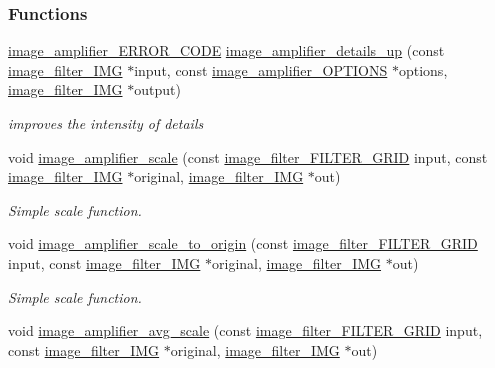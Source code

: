 \subsubsection*{Functions}
\begin{DoxyCompactItemize}
\item 
\hyperlink{a00011_a0d1363de9476dc6ae5b800ea4fade103}{image\-\_\-amplifier\-\_\-\-E\-R\-R\-O\-R\-\_\-\-C\-O\-D\-E} \hyperlink{a00011_ae99654f2d59a77ebcc06fbc4fcb46bf7}{image\-\_\-amplifier\-\_\-details\-\_\-up} (const \hyperlink{a00004}{image\-\_\-filter\-\_\-\-I\-M\-G} $\ast$input, const \hyperlink{a00002}{image\-\_\-amplifier\-\_\-\-O\-P\-T\-I\-O\-N\-S} $\ast$options, \hyperlink{a00004}{image\-\_\-filter\-\_\-\-I\-M\-G} $\ast$output)
\begin{DoxyCompactList}\small\item\em improves the intensity of details \end{DoxyCompactList}\item 
void \hyperlink{a00011_a8cf8d5fc4dc72339a2ca0b21d8b6c69e}{image\-\_\-amplifier\-\_\-scale} (const \hyperlink{a00012_a3d41ec3c203c47ad7dec21ff55acc883}{image\-\_\-filter\-\_\-\-F\-I\-L\-T\-E\-R\-\_\-\-G\-R\-I\-D} input, const \hyperlink{a00004}{image\-\_\-filter\-\_\-\-I\-M\-G} $\ast$original, \hyperlink{a00004}{image\-\_\-filter\-\_\-\-I\-M\-G} $\ast$out)
\begin{DoxyCompactList}\small\item\em Simple scale function. \end{DoxyCompactList}\item 
void \hyperlink{a00011_a7ef6a75724d9ffa2c5aec848895a0be7}{image\-\_\-amplifier\-\_\-scale\-\_\-to\-\_\-origin} (const \hyperlink{a00012_a3d41ec3c203c47ad7dec21ff55acc883}{image\-\_\-filter\-\_\-\-F\-I\-L\-T\-E\-R\-\_\-\-G\-R\-I\-D} input, const \hyperlink{a00004}{image\-\_\-filter\-\_\-\-I\-M\-G} $\ast$original, \hyperlink{a00004}{image\-\_\-filter\-\_\-\-I\-M\-G} $\ast$out)
\begin{DoxyCompactList}\small\item\em Simple scale function. \end{DoxyCompactList}\item 
void \hyperlink{a00011_a91adba19c8150ae3cf915e44b814a1e0}{image\-\_\-amplifier\-\_\-avg\-\_\-scale} (const \hyperlink{a00012_a3d41ec3c203c47ad7dec21ff55acc883}{image\-\_\-filter\-\_\-\-F\-I\-L\-T\-E\-R\-\_\-\-G\-R\-I\-D} input, const \hyperlink{a00004}{image\-\_\-filter\-\_\-\-I\-M\-G} $\ast$original, \hyperlink{a00004}{image\-\_\-filter\-\_\-\-I\-M\-G} $\ast$out)

\end{DoxyCompactItemize}
